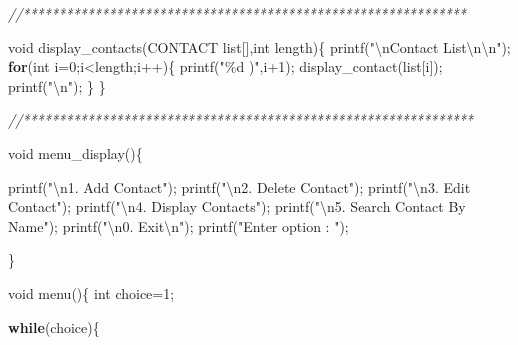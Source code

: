 \documentclass[
]{article}
\newenvironment{Shaded}{}{}
\newcommand{\CommentTok}[1]{\textcolor[rgb]{0.38,0.63,0.69}{\textit{#1}}}
\newcommand{\ControlFlowTok}[1]{\textcolor[rgb]{0.00,0.44,0.13}{\textbf{#1}}}
\newcommand{\DataTypeTok}[1]{\textcolor[rgb]{0.56,0.13,0.00}{#1}}
\newcommand{\DecValTok}[1]{\textcolor[rgb]{0.25,0.63,0.44}{#1}}
\newcommand{\NormalTok}[1]{#1}
\newcommand{\OperatorTok}[1]{\textcolor[rgb]{0.40,0.40,0.40}{#1}}
\newcommand{\SpecialCharTok}[1]{\textcolor[rgb]{0.25,0.44,0.63}{#1}}
\newcommand{\StringTok}[1]{\textcolor[rgb]{0.25,0.44,0.63}{#1}}
\begin{document}
\begin{Shaded}
\begin{Highlighting}[]
\CommentTok{//**************************************************************}

\DataTypeTok{void}\NormalTok{ display\_contacts}\OperatorTok{(}\NormalTok{CONTACT list}\OperatorTok{[],}\DataTypeTok{int}\NormalTok{ length}\OperatorTok{)\{}
\NormalTok{    printf}\OperatorTok{(}\StringTok{"}\SpecialCharTok{\textbackslash{}n}\StringTok{Contact List}\SpecialCharTok{\textbackslash{}n\textbackslash{}n}\StringTok{"}\OperatorTok{);}
    \ControlFlowTok{for}\OperatorTok{(}\DataTypeTok{int}\NormalTok{ i}\OperatorTok{=}\DecValTok{0}\OperatorTok{;}\NormalTok{i}\OperatorTok{\textless{}}\NormalTok{length}\OperatorTok{;}\NormalTok{i}\OperatorTok{++)\{}
\NormalTok{        printf}\OperatorTok{(}\StringTok{"\%d )"}\OperatorTok{,}\NormalTok{i}\OperatorTok{+}\DecValTok{1}\OperatorTok{);}
\NormalTok{        display\_contact}\OperatorTok{(}\NormalTok{list}\OperatorTok{[}\NormalTok{i}\OperatorTok{]);}
\NormalTok{        printf}\OperatorTok{(}\StringTok{"}\SpecialCharTok{\textbackslash{}n}\StringTok{"}\OperatorTok{);}
    \OperatorTok{\}}
\OperatorTok{\}}

\CommentTok{//***************************************************************}

\DataTypeTok{void}\NormalTok{ menu\_display}\OperatorTok{()\{}

\NormalTok{    printf}\OperatorTok{(}\StringTok{"}\SpecialCharTok{\textbackslash{}n}\StringTok{1. Add Contact"}\OperatorTok{);}
\NormalTok{    printf}\OperatorTok{(}\StringTok{"}\SpecialCharTok{\textbackslash{}n}\StringTok{2. Delete Contact"}\OperatorTok{);}
\NormalTok{    printf}\OperatorTok{(}\StringTok{"}\SpecialCharTok{\textbackslash{}n}\StringTok{3. Edit Contact"}\OperatorTok{);}
\NormalTok{    printf}\OperatorTok{(}\StringTok{"}\SpecialCharTok{\textbackslash{}n}\StringTok{4. Display Contacts"}\OperatorTok{);}
\NormalTok{    printf}\OperatorTok{(}\StringTok{"}\SpecialCharTok{\textbackslash{}n}\StringTok{5. Search Contact By Name"}\OperatorTok{);}
\NormalTok{    printf}\OperatorTok{(}\StringTok{"}\SpecialCharTok{\textbackslash{}n}\StringTok{0. Exit}\SpecialCharTok{\textbackslash{}n}\StringTok{"}\OperatorTok{);}
\NormalTok{    printf}\OperatorTok{(}\StringTok{"Enter option : "}\OperatorTok{);}

\OperatorTok{\}}

\DataTypeTok{void}\NormalTok{ menu}\OperatorTok{()\{}
    \DataTypeTok{int}\NormalTok{ choice}\OperatorTok{=}\DecValTok{1}\OperatorTok{;}

    \ControlFlowTok{while}\OperatorTok{(}\NormalTok{choice}\OperatorTok{)\{}


\end{Highlighting}
\end{Shaded}
\end{document}
